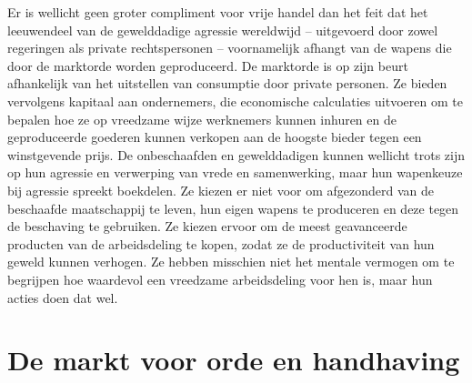 Er is wellicht geen groter compliment voor vrije handel dan het feit dat het leeuwendeel van de gewelddadige agressie wereldwijd -- uitgevoerd door zowel regeringen als private rechtspersonen -- voornamelijk afhangt van de wapens die door de marktorde worden geproduceerd. De marktorde is op zijn beurt afhankelijk van het uitstellen van consumptie door private personen. Ze bieden vervolgens kapitaal aan ondernemers, die economische calculaties uitvoeren om te bepalen hoe ze op vreedzame wijze werknemers kunnen inhuren en de geproduceerde goederen kunnen verkopen aan de hoogste bieder tegen een winstgevende prijs. De onbeschaafden en gewelddadigen kunnen wellicht trots zijn op hun agressie en verwerping van vrede en samenwerking, maar hun wapenkeuze bij agressie spreekt boekdelen. Ze kiezen er niet voor om afgezonderd van de beschaafde maatschappij te leven, hun eigen wapens te produceren en deze tegen de beschaving te gebruiken. Ze kiezen ervoor om de meest geavanceerde producten van de arbeidsdeling te kopen, zodat ze de productiviteit van hun geweld kunnen verhogen. Ze hebben misschien niet het mentale vermogen om te begrijpen hoe waardevol een vreedzame arbeidsdeling voor hen is, maar hun acties doen dat wel.

\hypertarget{de-markt-voor-orde-en-handhaving}{%
\section{De markt voor orde en handhaving}\label{de-markt-voor-orde-en-handhaving}}

